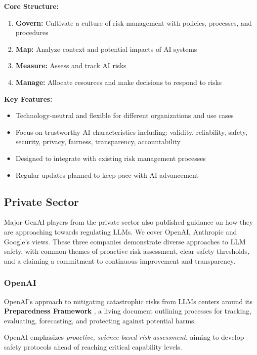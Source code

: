 \textbf{Core Structure:}
\begin{enumerate}
    \item \textbf{Govern:} Cultivate a culture of risk management with policies, processes, and procedures
    \item \textbf{Map:} Analyze context and potential impacts of AI systems
    \item \textbf{Measure:} Assess and track AI risks 
    \item \textbf{Manage:} Allocate resources and make decisions to respond to risks
\end{enumerate}

\textbf{Key Features:}
\begin{itemize}
    \item Technology-neutral and flexible for different organizations and use cases
    \item Focus on trustworthy AI characteristics including: validity, reliability, safety, security, privacy, fairness, transparency, accountability
    \item Designed to integrate with existing risk management processes
    \item Regular updates planned to keep pace with AI advancement
\end{itemize}

\subsection{Private Sector}

Major GenAI players from the private sector also published guidance on how they are approaching towards regulating LLMs. We cover OpenAI, Anthropic and Google's views. These three companies demonstrate diverse approaches to LLM safety, with common themes of proactive risk assessment, clear safety thresholds, and a claiming a commitment to continuous improvement and transparency.

\subsubsection{OpenAI}

OpenAI's approach to mitigating catastrophic risks from LLMs centers around its \textbf{Preparedness Framework} , a living document outlining processes for tracking, evaluating, forecasting, and protecting against potential harms.  

OpenAI emphasizes \textit{proactive, science-based risk assessment}, aiming to develop safety protocols ahead of reaching critical capability levels. 

